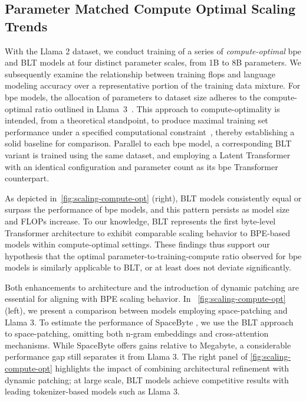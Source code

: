 \subsection{Parameter Matched Compute Optimal Scaling Trends}
\label{section:parameter-matched-scaling}
With the Llama 2 dataset, we conduct training of a series of \textit{compute-optimal} bpe and {\textsc BLT} models at four distinct parameter scales, from 1B to 8B parameters. We subsequently examine the relationship between training flops and language modeling accuracy over a representative portion of the training data mixture. For bpe models, the allocation of parameters to dataset size adheres to the compute-optimal ratio outlined in Llama~3~\citep{dubey2024llama}. This approach to compute-optimality is intended, from a theoretical standpoint, to produce maximal training set performance under a specified computational constraint~\citep{hoffmann2022training}, thereby establishing a solid baseline for comparison. Parallel to each bpe model, a corresponding {\textsc BLT} variant is trained using the same dataset, and employing a Latent Transformer with an identical configuration and parameter count as its bpe Transformer counterpart.

As depicted in~\autoref{fig:scaling-compute-opt} (right), {\textsc BLT} models consistently equal or surpass the performance of bpe models, and this pattern persists as model size and FLOPs increase. To our knowledge, {\textsc BLT} represents the first byte-level Transformer architecture to exhibit comparable scaling behavior to BPE-based models within compute-optimal settings. These findings thus support our hypothesis that the optimal parameter-to-training-compute ratio observed for bpe models is similarly applicable to {\textsc BLT}, or at least does not deviate significantly.

Both enhancements to architecture and the introduction of dynamic patching are essential for aligning with BPE scaling behavior. In ~\autoref{fig:scaling-compute-opt} (left), we present a comparison between models employing space-patching and Llama 3. To estimate the performance of SpaceByte \citep{slagle2024spacebyte}, we use the {\textsc BLT} approach to space-patching, omitting both n-gram embeddings and cross-attention mechanisms. While SpaceByte offers gains relative to Megabyte, a considerable performance gap still separates it from Llama 3. The right panel of \autoref{fig:scaling-compute-opt} highlights the impact of combining architectural refinement with dynamic patching; at large scale, {\textsc BLT} models achieve competitive results with leading tokenizer-based models such as Llama 3.

